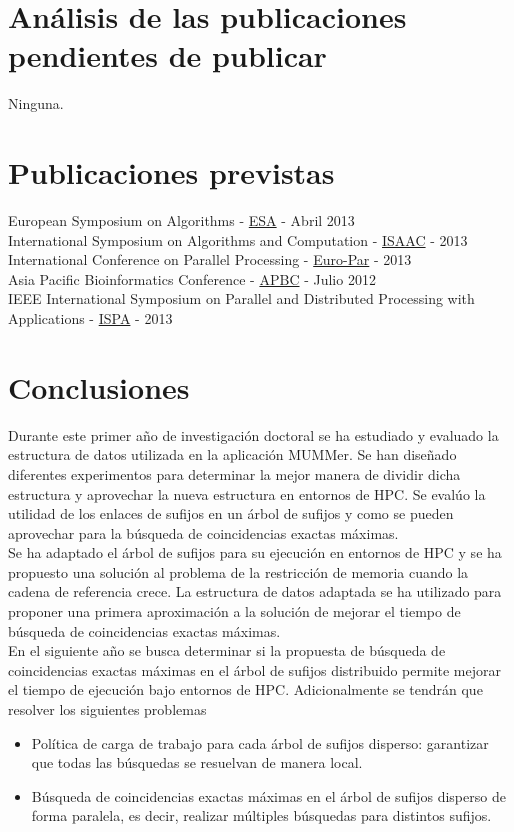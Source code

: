 \documentclass[12pt,a4paper]{article}
\begin{document}
\section{Análisis de las publicaciones pendientes de publicar}
\noindent
Ninguna.
\section{Publicaciones previstas}
European Symposium on Algorithms - \href{http://esa-symposium.org/}{ESA} - Abril 2013\\
International Symposium on Algorithms and Computation - \href{http://www.is.titech.ac.jp/isaac11/}{ISAAC} - 2013\\
International Conference on Parallel Processing - \href{http://www.grs-sim.de/news-events/news-archive/euro-par-2013.html}{Euro-Par} - 2013\\
Asia Pacific Bioinformatics Conference - \href{http://www.bioinformatics.ubc.ca/2012/01/30/apbc2013-the-eleventh-asia-pacific-bioinformatics-conference/}{APBC} - Julio 2012\\
IEEE International Symposium on Parallel and Distributed Processing with Applications - \href{http://www.arcos.inf.uc3m.es/ispa12/}{ISPA} - 2013

\section{Conclusiones}
\indent
Durante este primer año de investigación doctoral se ha estudiado y evaluado la estructura de datos utilizada en la aplicación MUMMer.
Se han diseñado diferentes experimentos para determinar la mejor manera de dividir dicha estructura y aprovechar la nueva estructura
en entornos de HPC. Se evalúo la utilidad de los enlaces de sufijos en un árbol de sufijos y como se pueden aprovechar para la 
búsqueda de coincidencias exactas máximas.\\
\indent
Se ha adaptado el árbol de sufijos para su ejecución en entornos de HPC y se ha propuesto una solución al problema de  la restricción
de memoria cuando la cadena de referencia crece. La estructura de datos adaptada se ha utilizado para proponer una primera aproximación a la 
solución de mejorar el tiempo de búsqueda de coincidencias exactas máximas.\\
\indent
En el siguiente año se busca determinar si la propuesta de búsqueda de coincidencias exactas máximas en el árbol de sufijos distribuido 
permite mejorar el tiempo de ejecución bajo entornos de HPC. Adicionalmente se tendrán que resolver los siguientes problemas
\begin{itemize}
  \item Política de carga de trabajo para cada árbol de sufijos disperso: garantizar que todas las búsquedas se resuelvan de manera local.
  \item Búsqueda de coincidencias exactas máximas en el árbol de sufijos disperso de forma paralela, es decir, realizar múltiples búsquedas
    para distintos sufijos. 
\end{itemize}
 
	
\end{document}
